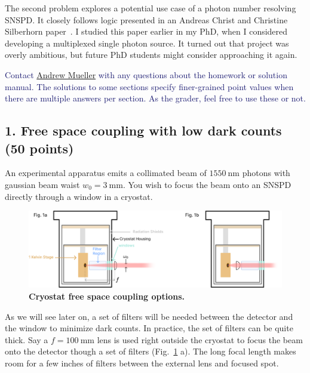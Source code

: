 \documentclass[11pt]{caltech_thesis} %
\begin{document}
The second problem explores a potential use case of a photon number resolving SNSPD. It closely follows logic presented in an Andreas Christ and Christine Silberhorn paper~\autocite{Andreas:12}. I studied this paper earlier in my PhD, when I considered developing a multiplexed single photon source. It turned out that project was overly ambitious, but future PhD students might consider approaching it again.

\textcolor{midnightblue}{Contact \href{mailto:andrewstermueller@gmail.com}{Andrew Mueller} with any questions about the homework or solution manual. The solutions to some sections specify finer-grained point values when there are multiple answers per section. As the grader, feel free to use these or not. }

\hypertarget{free-space-coupling-with-low-dark-counts-50-points}{%
\subsection{1. Free space coupling with low dark counts (50 points)}\label{free-space-coupling-with-low-dark-counts-50-points}}

An experimental apparatus emits a collimated beam of $1550~\mathrm{nm}$ photons with gaussian beam waist $w_0 = 3~\mathrm{mm}$. You wish to focus the beam onto an SNSPD directly through a window in a cryostat.

\hypertarget{fig:cryostat_concept}{%
\begin{figure}
\centering
\includegraphics{./chapter_07/figs/fig1b_light.pdf}
\caption[{Cryostat optical coupling}]{\textbf{Cryostat free space coupling options.}}
\label{fig:cryostat_concept}
\end{figure}
}

As we will see later on, a set of filters will be needed between the detector and the window to minimize dark counts. In practice, the set of filters can be quite thick. Say a $f = 100~\mathrm{mm}$ lens is used right outside the cryostat to focus the beam onto the detector though a set of filters (Fig.~\ref{fig:cryostat_concept} a). The long focal length makes room for a few inches of filters between the external lens and focused spot.
\end{document}
